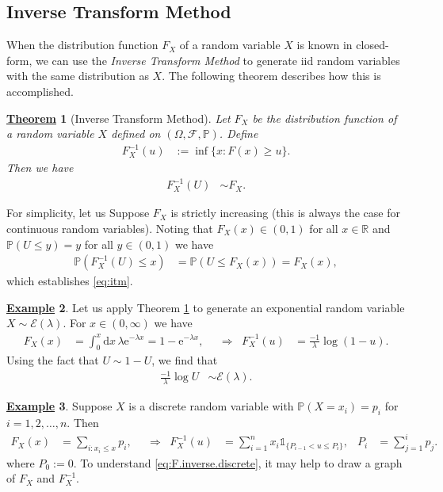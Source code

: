 \documentclass[12pt]{book}
\numberwithin{equation}{chapter}
\theoremstyle{plain}
\newtheorem{theorem}{\underline{Theorem}}
\numberwithin{theorem}{section}
\theoremstyle{definition}
\newtheorem{example}[theorem]{\underline{Example}}
\numberwithin{exercise}{chapter}
\let\oldendproof\endproof
\renewenvironment{proof}[1][\proofname]{%
  \oldproof[\scshape\underline{#1}]%
}{\oldendproof}
\newcommand{\<}{\langle}
\renewcommand{\>}{\rangle}
\renewcommand{\(}{\left(}
\renewcommand{\)}{\right)}
\renewcommand{\[}{\left[}
\renewcommand{\]}{\right]}
\newcommand\Ib{\mathds{1}} 	%
\newcommand\Pb{\mathds{P}}
\newcommand\Rb{\mathds{R}}
\newcommand\Ec{\mathscr{E}}
\newcommand\Fc{\mathscr{F}}
\newcommand\Om{\Omega}
\newcommand\lam{\lambda}
\newcommand\dd{\mathrm{d}}
\newcommand\ee{\mathrm{e}}
\begin{document}
\subsection{Inverse Transform Method}
\label{sec:itm}
When the distribution function $F_X$ of a random variable $X$ is known in closed-form, we can use the \emph{Inverse Transform Method} to generate iid random variables with the same distribution as $X$.  The following theorem describes how this is accomplished.
\begin{theorem}[Inverse Transform Method]
\label{thm:itm}
Let $F_X$ be the distribution function of a random variable $X$ defined on $(\Om,\Fc,\Pb)$.  
Define
\begin{align}
F_X^{-1}(u)
	&:=	\inf\{ x : F(x) \geq u \} . \label{eq:F.inverse}
\end{align}
Then we have
\begin{align}
F_X^{-1}(U)
	&\sim F_X . \label{eq:itm}
\end{align}
\end{theorem}

\begin{proof}
For simplicity, let us Suppose $F_X$ is strictly increasing (this is always the case for continuous random variables).  
Noting that $F_X(x) \in (0,1)$ for all $x \in \Rb$ and $\Pb( U \leq y) = y$ for all $y \in (0,1)$ we have
\begin{align}
\Pb( F_X^{-1}(U) \leq x )
	&=	\Pb( U \leq F_X(x) )
	=		F_X(x) ,
\end{align}
which establishes \eqref{eq:itm}.
\end{proof}

\begin{example}
Let us apply Theorem \ref{thm:itm} to generate an exponential random variable $X \sim \Ec(\lam)$.  For $x \in (0,\infty)$ we have
\begin{align}
F_X(x)
	&=	\int_0^x \dd x \, \lam \ee^{- \lam x} 
	=		1 - \ee^{-\lam x} , &
	&\Rightarrow&
F_X^{-1}(u)
	&=	\frac{-1}{\lam} \log (1 - u) .
\end{align}
Using the fact that $U \sim 1-U$, we find that
\begin{align}
\frac{-1}{\lam} \log U 
	&\sim \Ec(\lam).
\end{align}
\end{example}

\begin{example}
Suppose $X$ is a discrete random variable with $\Pb( X = x_i) = p_i$ for $i = 1, 2, \ldots, n$.  Then
\begin{align}
F_X(x)
	&=	\sum_{i:x_i \leq x} p_i , &
	&\Rightarrow&
F_X^{-1}(u)
	&=	\sum_{i=1}^n x_i \Ib_{\{P_{i-1} < u \leq P_{i}\}} , &
P_i
	&=	\sum_{j=1}^i p_j . \label{eq:F.inverse.discrete}
\end{align}
where $P_0 := 0$.  To understand \eqref{eq:F.inverse.discrete}, it may help to draw a graph of $F_X$ and $F_X^{-1}$.
\end{example}
\end{document}
